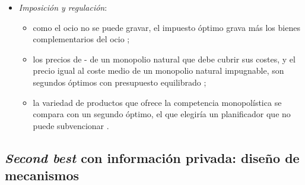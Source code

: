 \documentclass[11pt]{article}
\begin{document}
\begin{itemize}
  \begin{itemize}
  \item El FMI lo vivió en 1997: en septiembre, con la crisis asiática ya en marcha desde julio\nocite{BoT2026TomYumKung}, su Comité Provisional aún aprobó en Hong Kong la propuesta de enmendar el Convenio Constitutivo para incluir la liberalización de los movimientos de capital entre sus fines\nocite{FMI1997HongKong}.
  \item La crisis mostró que las entradas masivas de capital, con sistemas financieros débiles, habían aumentado la vulnerabilidad de esos países .
  \end{itemize}
\item \emph{Imposición y regulación}:
  \begin{itemize}
  \item como el ocio no se puede gravar, el impuesto óptimo grava más los bienes complementarios del ocio\nocite{CorlettHague1953Complementarity} ;
  \item los precios de - de un monopolio natural que debe cubrir sus costes, y el precio igual al coste medio de un monopolio natural impugnable, son segundos óptimos con presupuesto equilibrado  ;
  \item la variedad de productos que ofrece la competencia monopolística se compara con un segundo óptimo, el que elegiría un planificador que no puede subvencionar .
  \end{itemize}
\end{itemize}

\subsection{\emph{Second best} con información privada: diseño de mecanismos}\label{sec:second-best-informacion}
\end{document}
